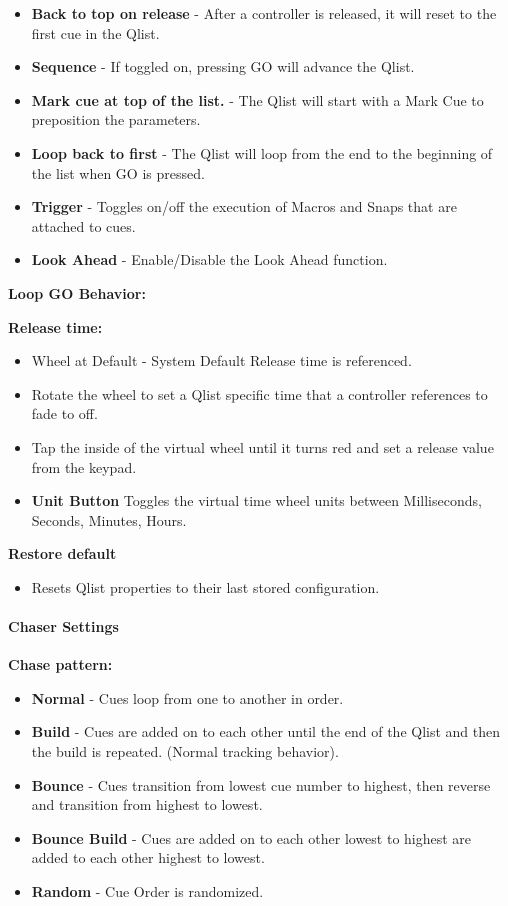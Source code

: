 \documentclass[
]{article}
\providecommand{\tightlist}{%
  \setlength{\itemsep}{0pt}\setlength{\parskip}{0pt}}
\begin{document}
\begin{itemize}
\item
  \textbf{Back to top on release} - After a controller is released, it will reset to the first cue in the Qlist.
\item
  \textbf{Sequence} - If toggled on, pressing GO will advance the Qlist.
\item
  \textbf{Mark cue at top of the list.} - The Qlist will start with a Mark Cue to preposition the parameters.
\item
  \textbf{Loop back to first} - The Qlist will loop from the end to the beginning of the list when GO is pressed.
\item
  \textbf{Trigger} - Toggles on/off the execution of Macros and Snaps that are attached to cues.
\item
  \textbf{Look Ahead} - Enable/Disable the Look Ahead function.
\end{itemize}

\textbf{Loop GO Behavior:}

\textbf{Release time:}

\begin{itemize}
\item
  Wheel at Default - System Default Release time is referenced.
\item
  Rotate the wheel to set a Qlist specific time that a controller references to fade to off.
\item
  Tap the inside of the virtual wheel until it turns red and set a release value from the keypad.
\item
  \textbf{Unit Button} Toggles the virtual time wheel units between Milliseconds, Seconds, Minutes, Hours.
\end{itemize}

\textbf{Restore default}

\begin{itemize}
\tightlist
\item
  Resets Qlist properties to their last stored configuration.
\end{itemize}

\hypertarget{chaser-settings}{%
\paragraph{Chaser Settings}\label{chaser-settings}}

\textbf{Chase pattern:}

\begin{itemize}
\item
  \textbf{Normal} - Cues loop from one to another in order.
\item
  \textbf{Build} - Cues are added on to each other until the end of the Qlist and then the build is repeated. (Normal tracking behavior).
\item
  \textbf{Bounce} - Cues transition from lowest cue number to highest, then reverse and transition from highest to lowest.
\item
  \textbf{Bounce Build} - Cues are added on to each other lowest to highest are added to each other highest to lowest.
\item
  \textbf{Random} - Cue Order is randomized.
\end{itemize}
\end{document}

